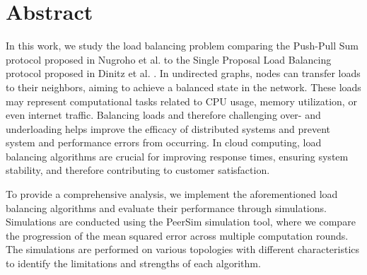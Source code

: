 \chapter*{Abstract}

In this work, we study the load balancing problem comparing the Push-Pull Sum protocol proposed in Nugroho et al. \cite{nugroho2023PushPullSumDataAg} to the Single Proposal Load Balancing protocol proposed in Dinitz et al. \cite{dinitz2022localDealAgreementloadBalancing}. In undirected graphs, nodes can transfer loads to their neighbors, aiming to achieve a balanced state in the network. These loads may represent computational tasks related to CPU usage, memory utilization, or even internet traffic. Balancing loads and therefore challenging over- and underloading helps improve the efficacy of distributed systems and prevent system and performance errors from occurring. In cloud computing, load balancing algorithms are crucial for improving response times, ensuring system stability, and therefore contributing to customer satisfaction.

To provide a comprehensive analysis, we implement the aforementioned load balancing algorithms and evaluate their performance through simulations. Simulations are conducted using the PeerSim simulation tool, where we compare the progression of the mean squared error across multiple computation rounds. The simulations are performed on various topologies with different characteristics to identify the limitations and strengths of each algorithm.


\iffalse
    In this work, we study load balancing algorithms in peer-to-peer (P2P) networks with different topologies. We consider the push-pull sum algorithm as well as the deal-agreement-based algorithm. The latter algorithms have been described by Yefim Dinitz et al. in "Local Deal-Agreement Algorithms for Load Balancing in Dynamic General Graphs". \cite{dinitz2022localDealAgreementloadBalancing}

    To depict a comprehensive analysis, we implement the mentioned load balancing algorithms and evaluate their outcomes using simulations. Simulations are conducted using the PeerSim simulation tool. The push-pull-sum algorithm is implemented as proposed in Saptadi Nugroho et al., "Adding Pull to Push Sum for Approximate Data Aggregation". \cite{nugroho2023PushPullSumDataAg}.

    The study aims not only to compare the simulations of the implemented algorithms but also to investigate limits and opportunities. The simulations depict the behaviour of the Mean Squared Error over 50 rounds each for different network sizes.
\fi